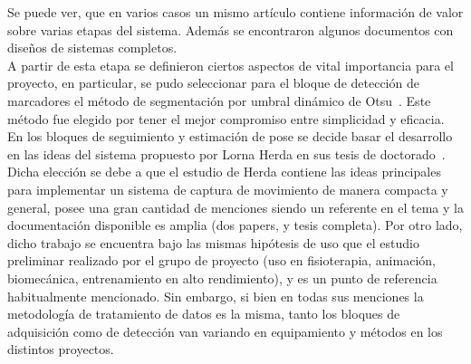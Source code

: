 Se puede ver, que en varios casos un mismo artículo contiene información de valor sobre varias etapas del sistema. Además se encontraron algunos documentos con diseños de sistemas completos.
\\ 

A partir de esta etapa se definieron ciertos aspectos de vital importancia para el proyecto, en particular, se pudo seleccionar para el bloque de detección de marcadores el método de segmentación por umbral dinámico de Otsu~\cite{otsu}. Este método fue elegido por tener el mejor compromiso entre simplicidad y eficacia.
\\ 

En los bloques de seguimiento y estimación de pose se decide basar el desarrollo en las ideas del sistema propuesto por Lorna Herda en sus tesis de doctorado~\cite{herda}. Dicha elección se debe a que el estudio de Herda contiene las ideas principales para implementar un sistema de captura de movimiento de manera compacta y general, posee una gran cantidad de menciones siendo un referente en el tema y la documentación disponible es amplia (dos papers, y tesis completa). Por otro lado, dicho trabajo se encuentra bajo las mismas hipótesis de uso que el estudio preliminar realizado por el grupo de proyecto (uso en fisioterapia, animación, biomecánica, entrenamiento en alto rendimiento), y es un punto de referencia habitualmente mencionado. Sin embargo, si bien en todas sus menciones la metodología de tratamiento de datos es la misma, tanto los bloques de adquisición como de detección van variando en equipamiento y métodos en los distintos proyectos.